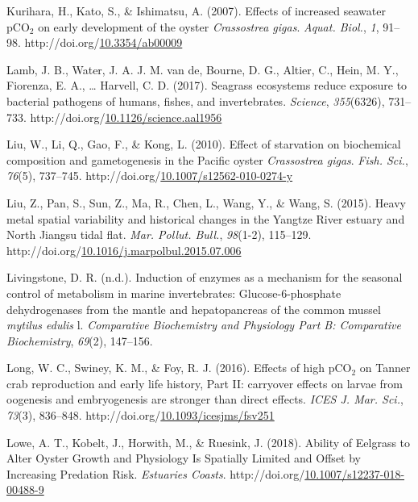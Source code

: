 \documentclass [11pt, proquest] {uwthesis}[2015/03/03]
\newlength{\cslhangindent}
\newenvironment{CSLReferences}%
{\setlength{\parindent}{0pt}%
\everypar{\setlength{\hangindent}{\cslhangindent}}\ignorespaces}%
{\par}
\begin{document}
\begin{CSLReferences}{1}{0}
\leavevmode\hypertarget{ref-Kurihara2007}{}%
Kurihara, H., Kato, S., \& Ishimatsu, A. (2007). {Effects of increased seawater {pCO\(_2\)} on early development of the oyster \emph{Crassostrea gigas}}. \emph{Aquat. Biol.}, \emph{1}, 91--98. http://doi.org/\href{https://doi.org/10.3354/ab00009}{10.3354/ab00009}

\leavevmode\hypertarget{ref-Lamb2017}{}%
Lamb, J. B., Water, J. A. J. M. van de, Bourne, D. G., Altier, C., Hein, M. Y., Fiorenza, E. A., \ldots{} Harvell, C. D. (2017). {Seagrass ecosystems reduce exposure to bacterial pathogens of humans, fishes, and invertebrates}. \emph{Science}, \emph{355}(6326), 731--733. http://doi.org/\href{https://doi.org/10.1126/science.aal1956}{10.1126/science.aal1956}

\leavevmode\hypertarget{ref-Liu2010}{}%
Liu, W., Li, Q., Gao, F., \& Kong, L. (2010). {Effect of starvation on biochemical composition and gametogenesis in the Pacific oyster \emph{Crassostrea gigas}}. \emph{Fish. Sci.}, \emph{76}(5), 737--745. http://doi.org/\href{https://doi.org/10.1007/s12562-010-0274-y}{10.1007/s12562-010-0274-y}

\leavevmode\hypertarget{ref-Liu2015}{}%
Liu, Z., Pan, S., Sun, Z., Ma, R., Chen, L., Wang, Y., \& Wang, S. (2015). {Heavy metal spatial variability and historical changes in the Yangtze River estuary and North Jiangsu tidal flat}. \emph{Mar. Pollut. Bull.}, \emph{98}(1-2), 115--129. http://doi.org/\href{https://doi.org/10.1016/j.marpolbul.2015.07.006}{10.1016/j.marpolbul.2015.07.006}

\leavevmode\hypertarget{ref-Livingstone1981}{}%
Livingstone, D. R. (n.d.). Induction of enzymes as a mechanism for the seasonal control of metabolism in marine invertebrates: Glucose-6-phosphate dehydrogenases from the mantle and hepatopancreas of the common mussel \emph{mytilus edulis} l. \emph{Comparative Biochemistry and Physiology Part B: Comparative Biochemistry}, \emph{69}(2), 147--156.

\leavevmode\hypertarget{ref-Long2016}{}%
Long, W. C., Swiney, K. M., \& Foy, R. J. (2016). {Effects of high {pCO\(_2\)} on Tanner crab reproduction and early life history, Part II: carryover effects on larvae from oogenesis and embryogenesis are stronger than direct effects}. \emph{ICES J. Mar. Sci.}, \emph{73}(3), 836--848. http://doi.org/\href{https://doi.org/10.1093/icesjms/fsv251}{10.1093/icesjms/fsv251}

\leavevmode\hypertarget{ref-Lowe2018}{}%
Lowe, A. T., Kobelt, J., Horwith, M., \& Ruesink, J. (2018). {Ability of Eelgrass to Alter Oyster Growth and Physiology Is Spatially Limited and Offset by Increasing Predation Risk}. \emph{Estuaries Coasts}. http://doi.org/\href{https://doi.org/10.1007/s12237-018-00488-9}{10.1007/s12237-018-00488-9}


\end{CSLReferences}
\end{document}
